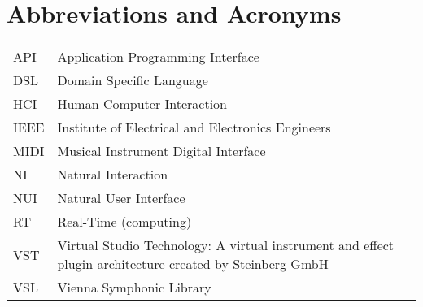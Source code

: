 \chapter*{Abbreviations and Acronyms}


\noindent
\begin{longtable}{@{}p{}p{}@{}}
API & Application Programming Interface \\
DSL & Domain Specific Language \\
HCI & Human-Computer Interaction \\
IEEE & Institute of Electrical and Electronics Engineers \\
MIDI & Musical Instrument Digital Interface \\
NI & Natural Interaction \\
NUI & Natural User Interface \\
RT & Real-Time (computing) \\
VST & Virtual Studio Technology: A virtual instrument and effect plugin architecture created by Steinberg GmbH \\
VSL & Vienna Symphonic Library

\end{longtable}
